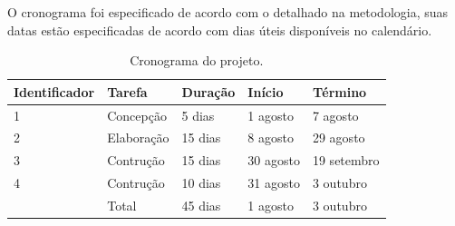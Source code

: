 \documentclass{article}
\begin{document}
O cronograma foi especificado de acordo com o detalhado na metodologia, suas datas estão especificadas de acordo com dias úteis disponíveis no calendário.\\
\begin{table}[!htbp]
                           \begin{center}
                \begin{tabular}{ | l | l | l | l | l |}
                \hline  
                \textbf{Identificador}& \textbf{Tarefa} &  \textbf{Duração} & \textbf{Início} & \textbf{Término} \\  \hline
                1 & Concepção & 5 dias & 1 agosto & 7 agosto \\  \hline
                2 & Elaboração & 15 dias & 8 agosto & 29 agosto \\  \hline
                3 & Contrução & 15 dias & 30 agosto & 19 setembro \\  \hline
                4 & Contrução & 10 dias & 31 agosto & 3 outubro \\ \hline
                  & Total & 45 dias & 1 agosto & 3 outubro \\
                \hline
                \end{tabular}
            \end{center}
               \caption{Cronograma do projeto. \label{fig:Cordova}}
\end{table}

\newpage 
\end{document}
